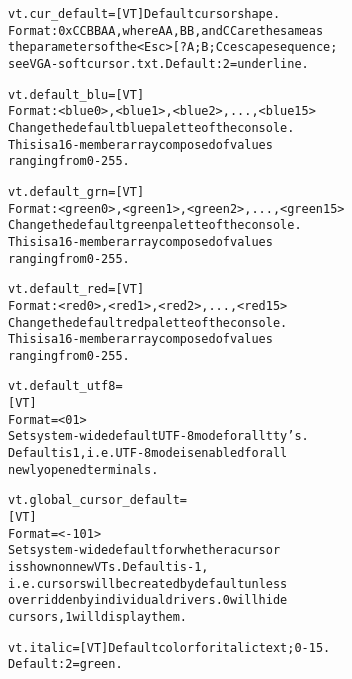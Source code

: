 \documentclass[a4paper,8pt,english]{sphinxmanual}
\begin{document}
\begin{alltt}
        vt.cur\_default= {[}VT{]} Default cursor shape.
                        Format: 0xCCBBAA, where AA, BB, and CC are the same as
                        the parameters of the \textless{}Esc\textgreater{}{[}?A;B;Cc escape sequence;
                        see VGA-softcursor.txt. Default: 2 = underline.

        vt.default\_blu= {[}VT{]}
                        Format: \textless{}blue0\textgreater{},\textless{}blue1\textgreater{},\textless{}blue2\textgreater{},...,\textless{}blue15\textgreater{}
                        Change the default blue palette of the console.
                        This is a 16-member array composed of values
                        ranging from 0-255.

        vt.default\_grn= {[}VT{]}
                        Format: \textless{}green0\textgreater{},\textless{}green1\textgreater{},\textless{}green2\textgreater{},...,\textless{}green15\textgreater{}
                        Change the default green palette of the console.
                        This is a 16-member array composed of values
                        ranging from 0-255.

        vt.default\_red= {[}VT{]}
                        Format: \textless{}red0\textgreater{},\textless{}red1\textgreater{},\textless{}red2\textgreater{},...,\textless{}red15\textgreater{}
                        Change the default red palette of the console.
                        This is a 16-member array composed of values
                        ranging from 0-255.

        vt.default\_utf8=
                        {[}VT{]}
                        Format=\textless{}0\textbar{}1\textgreater{}
                        Set system-wide default UTF-8 mode for all tty's.
                        Default is 1, i.e. UTF-8 mode is enabled for all
                        newly opened terminals.

        vt.global\_cursor\_default=
                        {[}VT{]}
                        Format=\textless{}-1\textbar{}0\textbar{}1\textgreater{}
                        Set system-wide default for whether a cursor
                        is shown on new VTs. Default is -1,
                        i.e. cursors will be created by default unless
                        overridden by individual drivers. 0 will hide
                        cursors, 1 will display them.

        vt.italic=      {[}VT{]} Default color for italic text; 0-15.
                        Default: 2 = green.


\end{alltt}
\end{document}
